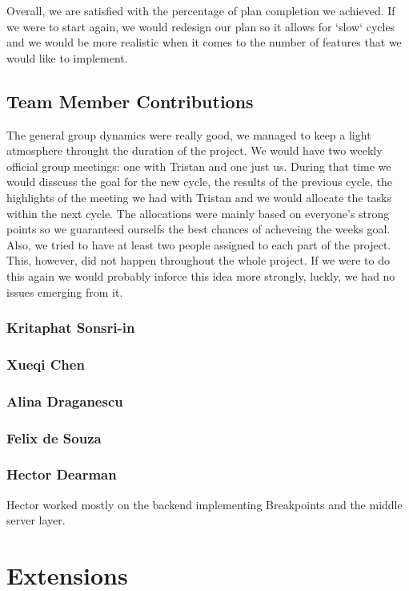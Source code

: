 \documentclass[11pt, a4paper]{article}
\begin{document}
Overall, we are satisfied with the percentage of plan completion we achieved. 
If we were to start again, we would redesign our plan so it allows for `slow` cycles and we would be more realistic when it comes to the number of features that we would like to implement.

\subsection{Team Member Contributions}

The general group dynamics were really good, we managed to keep a light atmosphere throught the duration of the project. 
We would have two weekly official group meetings: one with Tristan and one just us. 
During that time we would disscuss the goal for the new cycle, the results of the previous cycle, the highlights of the meeting we had with Tristan and we would allocate the tasks within the next cycle.
The allocations were mainly based on everyone's strong points so we guaranteed ourselfs the best chances of acheveing the weeks goal. 
Also, we tried to have at least two people assigned to each part of the project. 
This, however, did not happen throughout the whole project.
If we were to do this again we would probably inforce this idea more strongly, luckly, we had no issues emerging from it. 
\subsubsection{Kritaphat Sonsri-in}
\subsubsection{Xueqi Chen}
\subsubsection{Alina Draganescu}
\subsubsection{Felix de Souza}
\subsubsection{Hector Dearman}
Hector worked mostly on the backend implementing Breakpoints and the middle server layer.

\section{Extensions}
\end{document}

